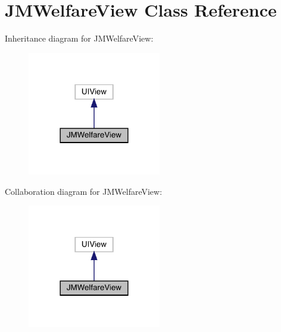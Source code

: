 \hypertarget{interface_j_m_welfare_view}{}\section{J\+M\+Welfare\+View Class Reference}
\label{interface_j_m_welfare_view}


Inheritance diagram for J\+M\+Welfare\+View\+:\nopagebreak
\begin{figure}[H]
\begin{center}
\leavevmode
\includegraphics[width=165pt]{interface_j_m_welfare_view__inherit__graph}
\end{center}
\end{figure}


Collaboration diagram for J\+M\+Welfare\+View\+:\nopagebreak
\begin{figure}[H]
\begin{center}
\leavevmode
\includegraphics[width=165pt]{interface_j_m_welfare_view__coll__graph}
\end{center}
\end{figure}
